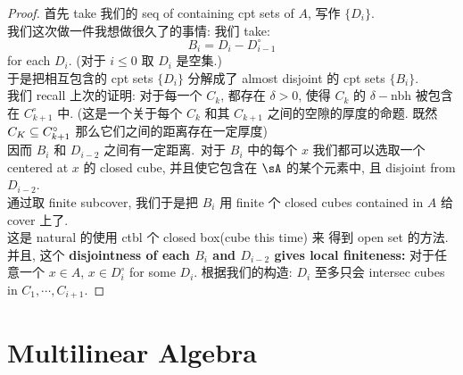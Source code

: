 \documentclass[lang=cn,11pt]{elegantbook}
\begin{document}
\begin{proof}
    首先 take 我们的 seq of containing cpt sets of $A$, 写作 $\{D_i\}$.\\
    我们这次做一件我想做很久了的事情: 我们 take:
    $$
    B_i = D_i - D_{i-1}^{\circ}
    $$ for each $D_i$. (对于 $i\leq 0$ 取 $D_i$ 是空集.)\\
    于是把相互包含的 cpt sets $\{D_i\}$ 分解成了 almost disjoint 的 cpt sets $\{B_i\}$. \\
    我们 recall 上次的证明: 对于每一个 $C_k$, 都存在 $\delta > 0$, 使得 $C_k$ 的 $\delta-$nbh 被包含在 $C_{k+1} ^ {\circ}$ 中. (这是一个关于每个 $C_k$ 和其 $C_{k+1}$ 之间的空隙的厚度的命题. 既然 $C_K \subseteq C_{k+1} ^ {\circ}$ 那么它们之间的距离存在一定厚度)\\
    因而 $B_i$ 和 $D_{i-2}$ 之间有一定距离.\
    对于 $B_i$ 中的每个 $x$ 我们都可以选取一个 centered at $x$ 的 closed cube, 并且使它包含在 $\sA$ 的某个元素中, 且 disjoint from $D_{i-2}$.\\
    通过取 finite subcover, 我们于是把 $B_i$ 用 finite 个 closed cubes contained in $A$ 给 cover 上了.\\
    这是 natural 的使用 ctbl 个 closed box(cube this time) 来 得到 open set 的方法.\\
    并且, 这个 \textbf{disjointness of each $B_i$ and $D_{i-2}$ gives local finiteness:} 对于任意一个 $x\in A$, $x \in D_i ^{\circ}$ for some $D_i$. 根据我们的构造: $D_i$ 至多只会 intersec cubes in $C_1, \cdots, C_{i+1}$. 
\end{proof}















\chapter{Multilinear Algebra}
\end{document}
